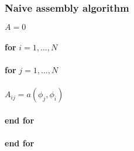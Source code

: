 \begin{frame}
  \frametitle{Naive assembly algorithm}

  \begin{tabbing}
    $A = 0$ \\
    \\
    \textbf{for} $i=1,\ldots,N$ \\
    \\
    \tab \textbf{for} $j=1,\ldots,N$ \\
    \\
    \tab \tab $A_{ij} = a(\phi_j, \phi_i)$ \\
    \\
    \tab \textbf{end for} \\
    \\
    \textbf{end for}
  \end{tabbing}

\end{frame}
